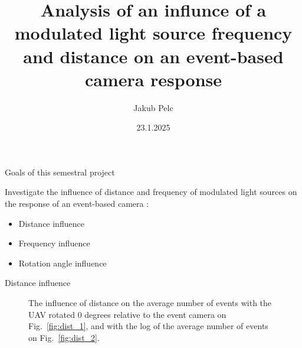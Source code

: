 \documentclass{beamer}
\title{Analysis of an influnce of a modulated light source frequency
and distance on an event-based camera response}
\date{23.1.2025}
\author{Jakub Pelc}
\institute{Faculty of Electrical Engineering, Czech Technical University in Prague}
\newcommand{\reffig}[1]{Fig.~\ref{#1}}
\begin{document}
	\maketitle

	\begin{frame}{Goals of this semestral project}
	
		Investigate the influence of distance and frequency of modulated light sources on the response of an event-based camera \cite{gallego2020event}:
		
		\begin{itemize}
			\item Distance influence
			\item Frequency influence
			\item Rotation angle influence
		\end{itemize}
	\end{frame}

	\begin{frame}{Distance influence}

		\begin{figure}
			\caption{
		The influence of distance on the average number of events with the UAV rotated 0 degrees relative to the event camera on \reffig{fig:dist_1}, and with the log of the average number of events on \reffig{fig:dist_2}.
		}
			\label{fig:dist}
		\end{figure}
	\end{frame}
\end{document}
